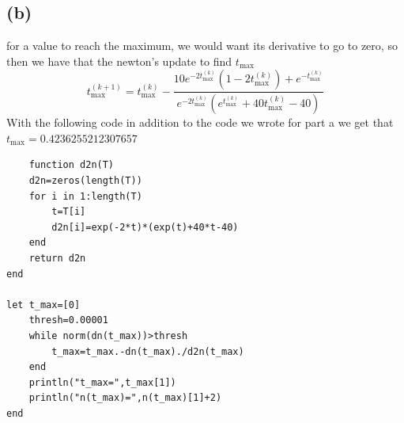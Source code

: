 \subsection*{(b)}
for a value to reach the maximum, we would want its derivative to go to zero, 
so then we have that the newton's update to find $t_{\text{max}}$
$$
    t_{\text{max}}^{(k+1)}=
    t_{\text{max}}^{(k)}-\frac{10e^{-2t_{\text{max}}^{(k)}}(1-2t_{\text{max}}^{(k)})+e^{-t_{\text{max}}^{(k)}}}
    {e^{-2t_{\text{max}}^{(k)}}(e^{t_{\text{max}}^{(k)}}+40t_{\text{max}}^{(k)}-40)}
$$
With the following code in addition to the code we wrote for part a we get that 
$t_{\text{max}}=\boxed{0.4236255212307657}$
\begin{verbatim}
    function d2n(T)
    d2n=zeros(length(T))
    for i in 1:length(T)
        t=T[i]
        d2n[i]=exp(-2*t)*(exp(t)+40*t-40)
    end
    return d2n
end

let t_max=[0]
    thresh=0.00001
    while norm(dn(t_max))>thresh
        t_max=t_max.-dn(t_max)./d2n(t_max)
    end
    println("t_max=",t_max[1])
    println("n(t_max)=",n(t_max)[1]+2)
end
\end{verbatim}






